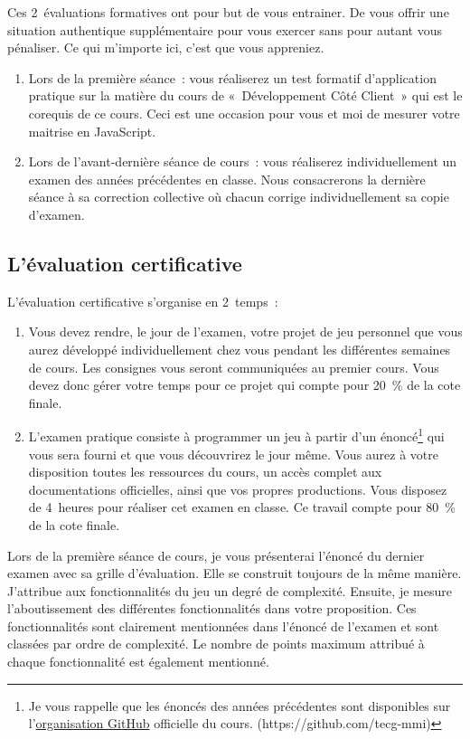 Ces 2~évaluations formatives ont pour but de vous entrainer. De vous offrir une situation authentique supplémentaire pour vous exercer sans pour autant vous pénaliser. Ce qui m'importe ici, c'est que vous appreniez.
\begin{enumerate}
    \item Lors de la première séance~: vous réaliserez un test formatif d’application pratique sur la matière du cours de «~Développement Côté Client~» qui est le corequis de ce cours. Ceci est une occasion pour vous et moi de mesurer votre maitrise en JavaScript.
    \item Lors de l'avant-dernière séance de cours~: vous réaliserez individuellement un examen des années précédentes en classe. Nous consacrerons la dernière séance à sa correction collective où chacun corrige individuellement sa copie d'examen.
\end{enumerate}

\subsection{L’évaluation certificative}
\label{eval_certificative}
L’évaluation certificative s'organise en 2~temps~:
\begin{enumerate}
    \item Vous devez rendre, le jour de l'examen, votre projet de jeu personnel que vous aurez développé individuellement chez vous pendant les différentes semaines de cours. Les consignes vous seront communiquées au premier cours. Vous devez donc gérer votre temps pour ce projet qui compte pour 20~\% de la cote finale.
    \item L'examen pratique consiste à programmer un jeu à partir d'un énoncé\footnote{Je vous rappelle que les énoncés des années précédentes sont disponibles sur l'\href{https://github.com/tecg-mmi}{organisation GitHub} officielle du cours. (https://github.com/tecg-mmi)} qui vous sera fourni et que vous découvrirez le jour même. Vous aurez à votre disposition toutes les ressources du cours, un accès complet aux documentations officielles, ainsi que vos propres productions. Vous disposez de 4~heures pour réaliser cet examen en classe. Ce travail compte pour 80~\% de la cote finale.
\end{enumerate}
Lors de la première séance de cours, je vous présenterai l'énoncé du dernier examen avec sa grille d'évaluation. Elle se construit toujours de la même manière. J'attribue aux fonctionnalités du jeu un degré de complexité. Ensuite, je mesure l'aboutissement des différentes fonctionnalités dans votre proposition. Ces fonctionnalités sont clairement mentionnées dans l'énoncé de l'examen et sont classées par ordre de complexité. Le nombre de points maximum attribué à chaque fonctionnalité est également mentionné.

